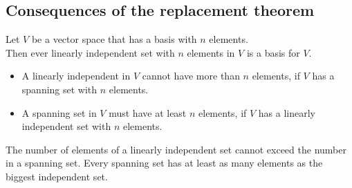 \documentclass[a4paper, 9pt]{extarticle}
\begin{document}
\subsection{Consequences of the replacement theorem}
\begin{theorembox}{}{}
  Let $V$ be a vector space that has a basis with $n$ elements. \\[2ex]
  Then ever linearly independent set with $n$ elements in $V$ is a basis for $V$.
\end{theorembox}
\begin{itemize}
  \item A linearly independent in $V$ cannot have more than $n$ elements, if $V$ has a spanning set with $n$ elements.
  \item A spanning set in $V$ must have at least $n$ elements, if $V$ has a linearly independent set with $n$ elements.
\end{itemize}
\begin{conceptbox}{}{}
  The number of elements of a linearly independent set cannot exceed the number in a spanning set. Every spanning set has at least as many elements as the biggest independent set.
\end{conceptbox}
\end{document}
